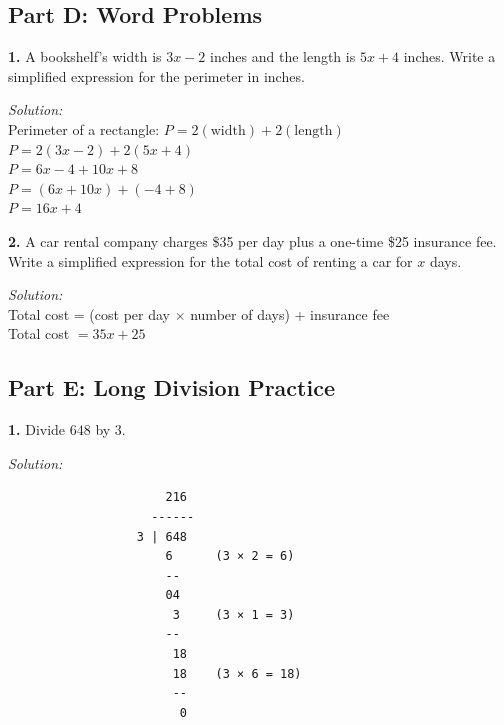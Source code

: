 \documentclass[12pt]{article}
\begin{document}

                \newpage

        \subsection*{Part D: Word Problems}

            \textbf{1.} A bookshelf's width is $3x - 2$ inches and the length is $5x + 4$ inches. Write a simplified expression for the perimeter in inches.

                \textit{Solution:}\\
                Perimeter of a rectangle: $P = 2(\text{width}) + 2(\text{length})$\\
                $P = 2(3x - 2) + 2(5x + 4)$\\
                $P = 6x - 4 + 10x + 8$\\
                $P = (6x + 10x) + (-4 + 8)$\\
                $P = 16x + 4$


                \vspace{0.5cm}

            \textbf{2.} A car rental company charges \$35 per day plus a one-time \$25 insurance fee. Write a simplified expression for the total cost of renting a car for $x$ days.

                \textit{Solution:}\\
                Total cost = (cost per day $\times$ number of days) + insurance fee\\
                Total cost $= 35x + 25$


                \newpage

        \subsection*{Part E: Long Division Practice}

            \textbf{1.} Divide $648$ by $3$.

                \textit{Solution:}\\
                \begin{verbatim}
                      216
                    ------
                  3 | 648
                      6      (3 × 2 = 6)
                      --
                      04
                       3     (3 × 1 = 3)
                      --
                       18
                       18    (3 × 6 = 18)
                       --
                        0
                \end{verbatim}
\end{document}

